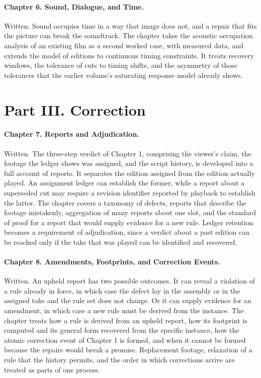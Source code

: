 \documentclass[11pt]{article}
\begin{document}
\paragraph{Chapter 6. Sound, Dialogue, and Time.} Written. Sound occupies time in a way that image does not, and a repair that fits the picture can break the soundtrack. The chapter takes the acoustic occupation analysis of an existing film as a second worked case, with measured data, and extends the model of editions to continuous timing constraints. It treats recovery windows, the tolerance of cuts to timing shifts, and the asymmetry of those tolerances that the earlier volume's saturating response model already shows.

\section*{Part III. Correction}

\paragraph{Chapter 7. Reports and Adjudication.} Written. The three-step verdict of Chapter 1, comprising the viewer's claim, the footage the ledger shows was assigned, and the script history, is developed into a full account of reports. It separates the edition assigned from the edition actually played. An assignment ledger can establish the former, while a report about a superseded cut may require a revision identifier reported by playback to establish the latter. The chapter covers a taxonomy of defects, reports that describe the footage mistakenly, aggregation of many reports about one slot, and the standard of proof for a report that would supply evidence for a new rule. Ledger retention becomes a requirement of adjudication, since a verdict about a past edition can be reached only if the take that was played can be identified and recovered.

\paragraph{Chapter 8. Amendments, Footprints, and Correction Events.} Written. An upheld report has two possible outcomes. It can reveal a violation of a rule already in force, in which case the defect lay in the assembly or in the assigned take and the rule set does not change. Or it can supply evidence for an amendment, in which case a new rule must be derived from the instance. The chapter treats how a rule is derived from an upheld report, how its footprint is computed and its general form recovered from the specific instance, how the atomic correction event of Chapter 1 is formed, and when it cannot be formed because the repairs would break a promise. Replacement footage, relaxation of a rule that the history permits, and the order in which corrections arrive are treated as parts of one process.
\end{document}
